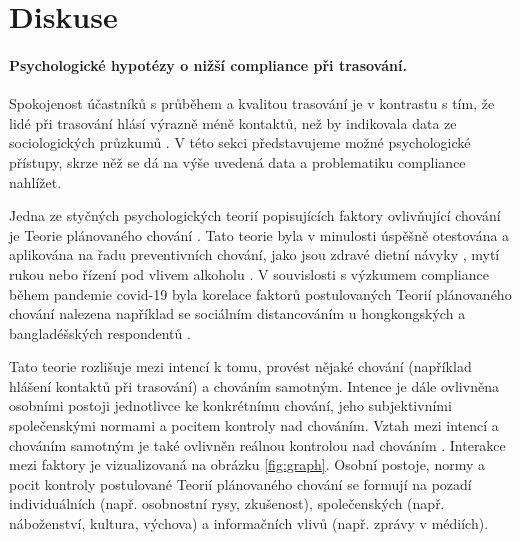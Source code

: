 \section*{Diskuse}
\paragraph*{Psychologické hypotézy o nižší compliance při trasování.}
Spokojenost účastníků s průběhem a kvalitou trasování je v kontrastu s tím, že lidé při trasování hlásí výrazně méně kontaktů, než by indikovala data ze sociologických průzkumů \cite{Prokop2020a}. V této sekci představujeme možné psychologické přístupy, skrze něž se dá na výše uvedená data a problematiku compliance nahlížet.  

Jedna ze styčných psychologických teorií popisujících faktory ovlivňující chování je Teorie plánovaného chování \cite{Ajzen1985}. Tato teorie byla v minulosti úspěšně otestována a aplikována na řadu preventivních chování, jako jsou zdravé dietní návyky \cite{Hackman2014}, mytí rukou \cite{Hackman2014} nebo řízení pod vlivem alkoholu \cite{Moan2011}. V souvislosti s výzkumem compliance během pandemie covid-19 byla korelace faktorů postulovaných Teorií plánovaného chování nalezena například se sociálním distancováním u hongkongských \cite{Yu2021} a bangladéšských respondentů \cite{Das2021}. 

Tato teorie rozlišuje mezi intencí k tomu, provést nějaké chování (například hlášení kontaktů při trasování) a chováním samotným. Intence je dále ovlivněna osobními postoji jednotlivce ke konkrétnímu chování, jeho subjektivními společenskými normami a pocitem kontroly nad chováním. 
Vztah mezi intencí a chováním samotným je také ovlivněn reálnou kontrolou nad chováním \cite{Ajzen1985}. Interakce mezi faktory je vizualizovaná na obrázku \ref{fig:graph}. Osobní postoje, normy a pocit kontroly postulované Teorií plánovaného chování se formují na pozadí individuálních (např. osobnostní rysy, zkušenost), společenských (např. náboženství, kultura, výchova) a informačních vlivů (např. zprávy v médiích). 


